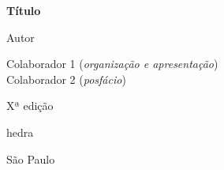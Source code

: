 





\begingroup\thispagestyle{empty}\vspace*{.05\textheight} 

            {\formular
              \huge
              \noindent
              \textbf{Título}\\
              
              \vspace{-0.5cm}
              
              }
             
                 \vspace{1cm}
              
              {\formular\Large
              \noindent{}Autor
              }

              \vfill              

              {\small
              \noindent{}Colaborador 1 (\textit{organização e
              apresentação})\\
              \noindent{}Colaborador 2 (\textit{posfácio})
              }

              \vspace{0.5cm}

              {\small\noindent{}Xª edição}

              \vfill

              \newfontfamily{}
              {\noindent\fontsize{30}{40}\selectfont \timesnewroman hedra}

              {\selectfont\small\noindent São Paulo \quad\the\year}

\endgroup
\pagebreak
